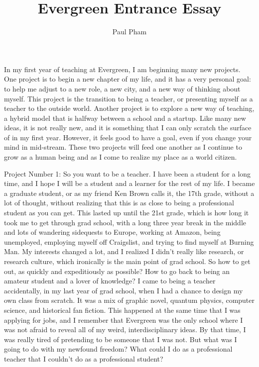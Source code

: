 \documentclass{article}
\title{Evergreen Entrance Essay}
\author{Paul Pham}
\begin{document}
\maketitle

In my first year of teaching at Evergreen, I am beginning many new projects. One project is to begin 
a new chapter of my life, and it has a very
personal goal: to help me adjust to a new role, a
new city, and a new way of thinking about myself.
This project is the transition to being a teacher,
or presenting myself as a teacher to the outside world.
Another project is to explore a new way of teaching,
a hybrid model that is halfway between a school
and a startup. Like many new ideas, it is not really
new, and it is something that I can only scratch
the surface of in my first year. However, it
feels good to have a goal, even if you change your mind in mid-stream. These two projects will feed
one another as I continue to grow as a human being
and as I come to realize my place as a world citizen.

Project Number 1: So you want to be a teacher.
I have been a student for
a long time, and I hope I will be a student and
a learner for the rest of my life. I became a
graduate student, or as my friend Ken Brown calls it,
the 17th grade, without a lot of thought, without
realizing that this is as close to being a
professional student as you can get. This lasted up
until the 21st grade, which is
how long it took me to get through grad school, with
a long three year break in the middle and lots of
wandering sidequests to Europe, working at Amazon,
being unemployed, employing myself off Craigslist,
and trying to find myself at Burning Man.
My interests changed a lot, and I realized I didn't
really like research, or research culture, which 
ironically is the main point of grad school. So how 
to get out, as quickly
and expeditiously as possible? How to go back to
being an amateur student and a lover of knowledge?
I came to being a teacher accidentally, in my
last year of grad school, when I had a chance to
design my own class from scratch. It was a mix of
graphic novel, quantum physics, computer science,
and historical fan fiction. This happened
at the same time that I was applying for jobs, and
I remember that Evergreen was the only school where
I was not afraid to reveal all of my weird,
interdisciplinary ideas. By that time, I was really
tired of pretending to be someone that I was not.
But what was I going to do with my newfound freedom?
What could I do as a professional teacher that I
couldn't do as a professional student?
\end{document}
